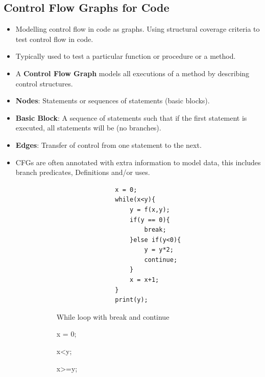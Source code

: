 \documentclass[a4paper]{article}
\begin{document}
\subsection{Control Flow Graphs for Code}
\begin{itemize}
    \item Modelling control flow in code as graphs. Using structural coverage criteria to test control flow in code.
    \item Typically used to test a particular function or procedure or a method.
    \item A \textbf{Control Flow Graph} models all executions of a method by describing control structures.
    \item \textbf{Nodes}: Statements or sequences of statements (basic blocks).
    \item \textbf{Basic Block}: A sequence of statements such that if the first statement is executed, all statements will be (no branches).
    \item \textbf{Edges}: Transfer of control from one statement to the next.
    \item CFGs are often annotated with extra information to model data, this includes branch predicates, Definitions and/or uses.
    \begin{figure}[H]
        \centering
        \begin{subfigure}[b]{0.45\textwidth}
            \begin{verbatim}
                x = 0;
                while(x<y){
                    y = f(x,y);
                    if(y == 0){
                        break;
                    }else if(y<0){
                        y = y*2;
                        continue;
                    }
                    x = x+1;
                }
                print(y);
            \end{verbatim}
            \caption{While loop with break and continue}
        \end{subfigure}
        \hfill
        \begin{subfigure}[b]{0.45\textwidth}
            \begin{myverbbox}{\vertexONE}
                x = 0;
            \end{myverbbox}
            \begin{myverbbox}{\edgeONE}
                x<y;
            \end{myverbbox}
            \begin{myverbbox}{\edgeTWO}
                x>=y;
            \end{myverbbox}

\end{subfigure}
\end{figure}
\end{itemize}
\end{document}
